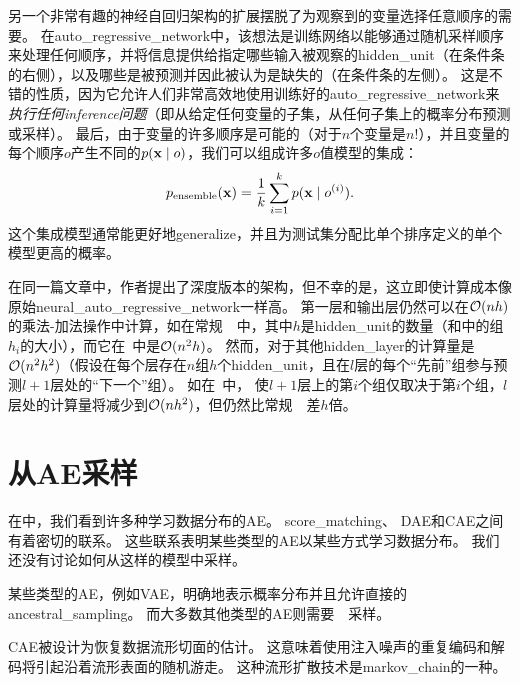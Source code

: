 另一个非常有趣的神经自回归架构的扩展摆脱了为观察到的变量选择任意顺序的需要\citep{Uria+al-ICML2014}。
在\gls{auto_regressive_network}中，该想法是训练网络以能够通过随机采样顺序来处理任何顺序，并将信息提供给指定哪些输入被观察的\gls{hidden_unit}（在条件条的右侧），以及哪些是被预测并因此被认为是缺失的（在条件条的左侧）。
这是不错的性质，因为它允许人们非常高效地使用训练好的\gls{auto_regressive_network}来\emph{执行任何\gls{inference}问题}（即从给定任何变量的子集，从任何子集上的概率分布预测或采样）。
最后，由于变量的许多顺序是可能的（对于$n$个变量是$n!$），并且变量的每个顺序$o$产生不同的$p(\mathbf{x} \mid o)$，我们可以组成许多$o$值模型的集成：
\begin{align}
 p_{\text{ensemble}}(\mathbf{x}) = \frac{1}{k} \sum_{i=1}^k p(\mathbf{x}  \mid  o^{(i)}).
\end{align}
这个集成模型通常能更好地\gls{generalize}，并且为测试集分配比单个排序定义的单个模型更高的概率。


在同一篇文章中，作者提出了深度版本的架构，但不幸的是，这立即使计算成本像原始\gls{neural_auto_regressive_network}一样高\citep{Bengio+Bengio-NIPS2000}。
第一层和输出层仍然可以在$\mathcal{O}(nh)$的乘法-加法操作中计算，如在常规~~中，其中$h$是\gls{hidden_unit}的数量（和中的组$h_i$的大小），而它在~\citet{Bengio+Bengio-NIPS2000}中是$\mathcal{O}(n^2h)$。
然而，对于其他\gls{hidden_layer}的计算量是$\mathcal{O}(n^2 h^2)$（假设在每个层存在$n$组$h$个\gls{hidden_unit}，且在$l$层的每个``先前''组参与预测$l+1$层处的``下一个''组）。
如在~\citet{Uria+al-ICML2014}中， 使$l+1$层上的第$i$个组仅取决于第$i$个组，$l$层处的计算量将减少到$\mathcal{O}(nh^2)$，但仍然比常规~~差$h$倍。


\section{从\gls{AE}采样}
\label{sec:drawing_samples_from_autoencoders}

在中，我们看到许多种学习数据分布的\gls{AE}。
\gls{score_matching}、 \gls{DAE}和\gls{CAE}之间有着密切的联系。
这些联系表明某些类型的\gls{AE}以某些方式学习数据分布。
我们还没有讨论如何从这样的模型中采样。

某些类型的\gls{AE}，例如\gls{VAE}，明确地表示概率分布并且允许直接的\gls{ancestral_sampling}。
而大多数其他类型的\gls{AE}则需要~~采样。

\gls{CAE}被设计为恢复数据流形切面的估计。
这意味着使用注入噪声的重复编码和解码将引起沿着流形表面的随机游走\citep{Rifai-icml2012-small,Mesnil-et-al-LW2012}。
这种流形扩散技术是\gls{markov_chain}的一种。

